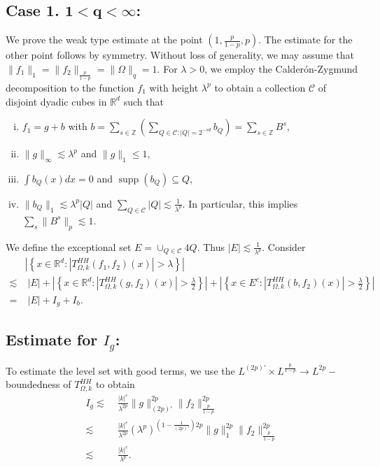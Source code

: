 \documentclass[a4paper,reqno]{amsart}
\newcommand{\R}{{\mathbb R}}       %
\newcommand{\Z}{{\mathbb Z}}
\newcommand{\supp}[1]{\operatorname{supp}(#1)}   %
\theoremstyle{definition}
\numberwithin{equation}{section}
\begin{document}
	\subsection*{Case 1. $\mathbf{1<q<\infty}$:} We prove the weak type estimate at the point $\left(1,\frac{p}{1-p},p\right)$. The estimate for the other point follows by symmetry. Without loss of generality, we may assume that  $\|f_1\|_{1}=\|f_2\|_{\frac{p}{1-p}}=\|\Omega\|_q=1$. For $\lambda>0$, we employ the Calder\'on-Zygmund decomposition to the function $f_1$ with height $\lambda^{p}$ to obtain a collection $\mathcal{C}$ of disjoint dyadic cubes in $\R^d$ such that
	\begin{enumerate}[i)]
		\item $f_1=g+b$ with $b=\sum_{s\in\Z}\left(\sum_{Q\in\mathcal{C}:|Q|=2^{-sd}}b_{Q}\right)=\sum_{s\in\Z}B^{s}$,
		\item $\|g\|_\infty\lesssim\lambda^p$ and $\|g\|_{1}\leq1$,
		\item $\int b_{Q}(x)dx=0$ and $\supp{b_{Q}}\subseteq Q$,
		\item $\|b_{Q}\|_{1}\lesssim\lambda^{p}|Q|$ and $\sum_{Q\in\mathcal{C}}|Q|\lesssim\frac{1}{\lambda^{p}}$. In particular, this implies $\sum_s\|B^{s}\|_{p}\lesssim1$.
	\end{enumerate}
	We define the exceptional set $E=\cup_{Q\in\mathcal{C}}4Q$. Thus $|E|\lesssim\frac{1}{\lambda^{p}}$. Consider
	\begin{align*}
		&\left|\left\{x\in \R^d:|T^{HH}_{\Omega,k}(f_1,f_2)(x)|>\lambda\right\}\right|\\
		\lesssim&\;|E|+\left|\left\{x\in \R^d:|T^{HH}_{\Omega,k}(g,f_2)(x)|>\frac{\lambda}{2}\right\}\right|+\left|\left\{x\in E^c:|T^{HH}_{\Omega,k}(b,f_2)(x)|>\frac{\lambda}{2}\right\}\right|\\
		=&\;|E|+I_g+I_b.
	\end{align*}
	\subsection*{Estimate for $I_g$:} To estimate the level set with good terms, we use the $L^{(2p)'}\times L^{\frac{p}{1-p}} \to L^{2p}-$boundedness of $T^{HH}_{\Omega,k}$ to obtain
	\begin{align*}
		I_g\lesssim&\;\frac{|k|^c}{\lambda^{2p}}\|g\|_{(2p)'}^{2p}\|f_2\|_{\frac{p}{1-p}}^{2p}\\
		\lesssim&\;\frac{|k|^c}{\lambda^{2p}}(\lambda^p)^{\left(1-\frac{1}{(2p)'}\right)2p}\|g\|_{1}^{2p}\|f_2\|_{\frac{p}{1-p}}^{2p}\\
		\lesssim&\;\frac{|k|^c}{\lambda^p}.
	\end{align*}
\end{document}
